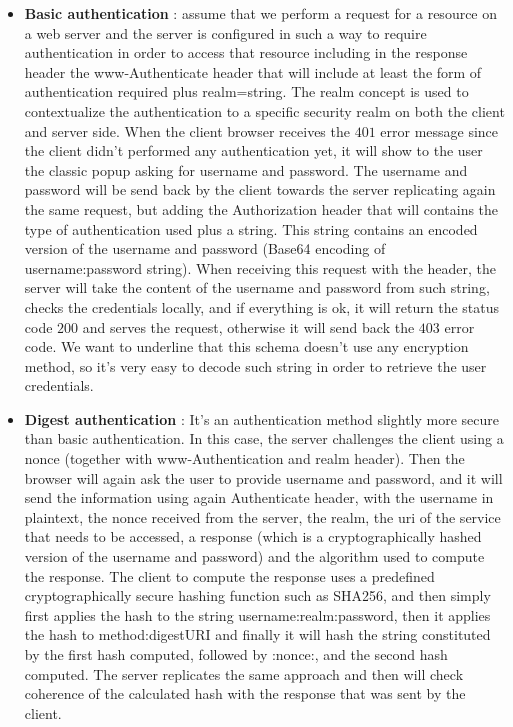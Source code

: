 \begin{itemize}
\item \textbf{Basic authentication} : assume that we perform a request for a resource on a web server and the server is configured in such a way to require authentication in order to access that resource including in the response header the www-Authenticate header that will include at least the form of authentication required plus realm=string. The realm concept is used to contextualize the authentication to a specific security realm on both the client and server side. When the client browser receives the $401$ error message since the client didn't performed any authentication yet, it will show to the user the classic popup asking for username and password. The username and password will be send back by the client towards the server replicating again the same request, but adding the Authorization header that will contains the type of authentication used plus a string. This string contains an encoded version of the username and password (Base64 encoding of username:password string). When receiving this request with the header, the server will take the content of the username and password from such string, checks the credentials locally, and if everything is ok, it will return the status code $200$ and serves the request, otherwise it will send back the $403$ error code. We want to underline that this schema doesn't use any encryption method, so it's very easy to decode such string in order to retrieve the user credentials. 
\item \textbf{Digest authentication} : It's an authentication method slightly more secure than basic authentication. In this case, the server challenges the client using a nonce (together with www-Authentication and realm header). Then the browser will again ask the user to provide username and password, and it will send the information using again Authenticate header, with the username in plaintext, the nonce received from the server, the realm, the uri of the service that needs to be accessed, a response (which is a cryptographically hashed version of the username and password) and the algorithm used to compute the response. The client to compute the response uses a predefined cryptographically secure hashing function such as SHA256, and then simply first applies the hash to the string username:realm:password, then it applies the hash to method:digestURI and finally it will hash the string constituted by the first hash computed, followed by :nonce:, and the second hash computed. The server replicates the same approach and then will check coherence of the calculated hash with the response that was sent by the client.
\end{itemize}


